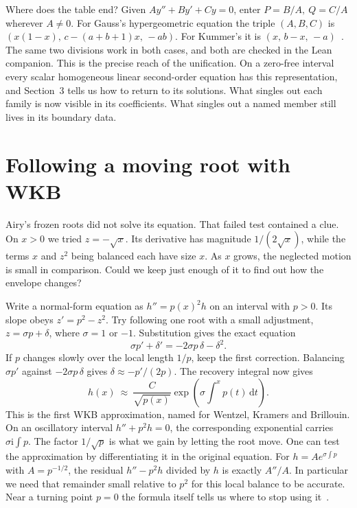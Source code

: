 \documentclass[11pt,a4paper]{amsart}
\newcommand{\dif}{\mathrm{d}}
\newcommand{\ii}{\mathrm{i}}
\theoremstyle{definition}
\theoremstyle{remark}
\begin{document}
Where does the table end? Given \(Ay''+By'+Cy=0\), enter \(P=B/A,\ Q=C/A\) wherever \(A\ne0\). For Gauss's hypergeometric equation the triple \((A,B,C)\) is \((x(1-x),\,c-(a+b+1)x,\,-ab)\). For Kummer's it is \((x,\,b-x,\,-a)\)~\cite{NISTHyper}. The same two divisions work in both cases, and both are checked in the Lean companion. This is the precise reach of the unification. On a zero-free interval every scalar homogeneous linear second-order equation has this representation, and Section~3 tells us how to return to its solutions. What singles out each family is now visible in its coefficients. What singles out a named member still lives in its boundary data.

\section{Following a moving root with WKB}
Airy's frozen roots did not solve its equation. That failed test contained a clue. On \(x>0\) we tried \(z=-\sqrt{x}\). Its derivative has magnitude \(1/(2\sqrt{x})\), while the terms \(x\) and \(z^2\) being balanced each have size \(x\). As \(x\) grows, the neglected motion is small in comparison. Could we keep just enough of it to find out how the envelope changes?

Write a normal-form equation as \(h''=p(x)^2h\) on an interval with \(p>0\). Its slope obeys \(z'=p^2-z^2\). Try following one root with a small adjustment, \(z=\sigma p+\delta\), where \(\sigma=1\) or \(-1\). Substitution gives the exact equation
\[
 \sigma p'+\delta'=-2\sigma p\,\delta-\delta^2.
\]
If \(p\) changes slowly over the local length \(1/p\), keep the first correction. Balancing \(\sigma p'\) against \(-2\sigma p\,\delta\) gives \(\delta\approx-p'/(2p)\). The recovery integral now gives
\[
 h(x)\ \approx\ \frac{C}{\sqrt{p(x)}}\exp\!\left(\sigma\int^x p(t)\,\dif t\right).
\]
This is the first WKB approximation, named for Wentzel, Kramers and Brillouin. On an oscillatory interval \(h''+p^2h=0\), the corresponding exponential carries \(\sigma\ii\int p\). The factor \(1/\sqrt p\) is what we gain by letting the root move. One can test the approximation by differentiating it in the original equation. For \(h=Ae^{\sigma\int p}\) with \(A=p^{-1/2}\), the residual \(h''-p^2h\) divided by \(h\) is exactly \(A''/A\). In particular we need that remainder small relative to \(p^2\) for this local balance to be accurate. Near a turning point \(p=0\) the formula itself tells us where to stop using it~\cite{BenOrszag1978,Olver1974}.
\end{document}
